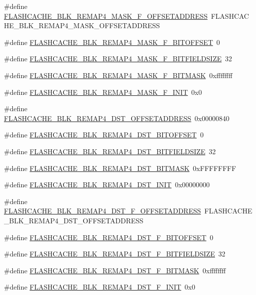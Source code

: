 \begin{DoxyCompactItemize}
\item 
\#define \hyperlink{a00550_a8bb057dc4f53b8db653d8ce5f15026aa}{FLASHCACHE\_\-BLK\_\-REMAP4\_\-MASK\_\-F\_\-OFFSETADDRESS}~FLASHCACHE\_\-BLK\_\-REMAP4\_\-MASK\_\-OFFSETADDRESS
\item 
\#define \hyperlink{a00550_a2684d03ed6bf869d26d71d14c3448d44}{FLASHCACHE\_\-BLK\_\-REMAP4\_\-MASK\_\-F\_\-BITOFFSET}~0
\item 
\#define \hyperlink{a00550_a3653b6530b75e87de3c5e0c7ae4207d7}{FLASHCACHE\_\-BLK\_\-REMAP4\_\-MASK\_\-F\_\-BITFIELDSIZE}~32
\item 
\#define \hyperlink{a00550_a8639e7a962faa54c7d2b3395021a1688}{FLASHCACHE\_\-BLK\_\-REMAP4\_\-MASK\_\-F\_\-BITMASK}~0xffffffff
\item 
\#define \hyperlink{a00550_a8f8cacec1a3826550c44a4aa4b410bb8}{FLASHCACHE\_\-BLK\_\-REMAP4\_\-MASK\_\-F\_\-INIT}~0x0
\item 
\#define \hyperlink{a00550_ab708bd8ae0bd948b933cb720340cbadc}{FLASHCACHE\_\-BLK\_\-REMAP4\_\-DST\_\-OFFSETADDRESS}~0x00000840
\item 
\#define \hyperlink{a00550_a5ccee0cc55cb56ff954f178d58ce4bfc}{FLASHCACHE\_\-BLK\_\-REMAP4\_\-DST\_\-BITOFFSET}~0
\item 
\#define \hyperlink{a00550_a6de204385d6a9a07bb27f1c69adf189b}{FLASHCACHE\_\-BLK\_\-REMAP4\_\-DST\_\-BITFIELDSIZE}~32
\item 
\#define \hyperlink{a00550_ade78f575af70a99eceaaa232e199049e}{FLASHCACHE\_\-BLK\_\-REMAP4\_\-DST\_\-BITMASK}~0xFFFFFFFF
\item 
\#define \hyperlink{a00550_a58f228aeb11782c1088bb4c653109e93}{FLASHCACHE\_\-BLK\_\-REMAP4\_\-DST\_\-INIT}~0x00000000
\item 
\#define \hyperlink{a00550_a894fbffff715cd19760b288453899caf}{FLASHCACHE\_\-BLK\_\-REMAP4\_\-DST\_\-F\_\-OFFSETADDRESS}~FLASHCACHE\_\-BLK\_\-REMAP4\_\-DST\_\-OFFSETADDRESS
\item 
\#define \hyperlink{a00550_ad50260d8cecd00db27438b78a35ee787}{FLASHCACHE\_\-BLK\_\-REMAP4\_\-DST\_\-F\_\-BITOFFSET}~0
\item 
\#define \hyperlink{a00550_aa43fe30887c01fe336ebbe505f35cd51}{FLASHCACHE\_\-BLK\_\-REMAP4\_\-DST\_\-F\_\-BITFIELDSIZE}~32
\item 
\#define \hyperlink{a00550_a319e4cd505dcb44717606db32e6c3dd1}{FLASHCACHE\_\-BLK\_\-REMAP4\_\-DST\_\-F\_\-BITMASK}~0xffffffff
\item 
\#define \hyperlink{a00550_a0bd4bffcf9ac0f5d02510b92f9636aa5}{FLASHCACHE\_\-BLK\_\-REMAP4\_\-DST\_\-F\_\-INIT}~0x0

\end{DoxyCompactItemize}
